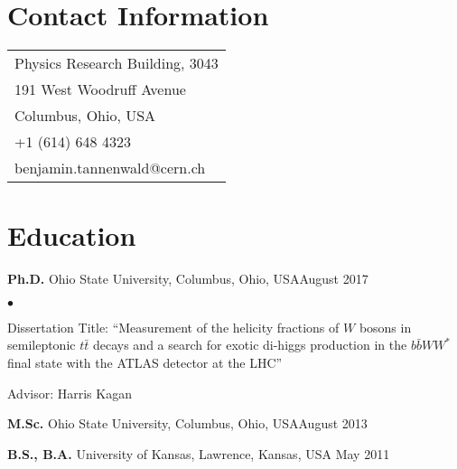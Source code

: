 \documentclass[margin,line]{res}
\newenvironment{list1}{
  \begin{list}{\ding{113}}{%
      \setlength{\itemsep}{0in}
      \setlength{\parsep}{0in} \setlength{\parskip}{0in}
      \setlength{\topsep}{0in} \setlength{\partopsep}{0in} 
      \setlength{\leftmargin}{0.17in}}}{\end{list}}
\newenvironment{list2}{
  \begin{list}{$\bullet$}{%
      \setlength{\itemsep}{0in}
      \setlength{\parsep}{0in} \setlength{\parskip}{0in}
      \setlength{\topsep}{0in} \setlength{\partopsep}{0in} 
      \setlength{\leftmargin}{0.2in}}}{\end{list}}
\begin{document}

\begin{resume}
\section{\sc Contact Information}
\vspace{.05in}
\begin{tabular}{@{}p{2in}}
Physics Research Building, 3043 \\
191 West Woodruff Avenue \\
Columbus, Ohio, USA \\
+1 (614) 648 4323 \\
benjamin.tannenwald@cern.ch \\
\end{tabular}


\section{\sc Education}
{\bf Ph.D.} Ohio State University, Columbus, Ohio, USA\hfill August 2017\\
\vspace*{-.22in}
\begin{list2}
\vspace*{.1in}
\item Dissertation Title:  ``Measurement of the helicity fractions of $W$ bosons in semileptonic $t\bar{t}$ decays and a search for exotic di-higgs production in the $b\bar{b}WW^*$ final state with the ATLAS detector at the LHC''
\item Advisor:  Harris Kagan
\end{list2}

{\bf M.Sc.} Ohio State University, Columbus, Ohio, USA\hfill August 2013\\
\vspace*{-.2in}

{\bf B.S., B.A.} University of Kansas, Lawrence, Kansas, USA \hfill May 2011\\


\end{resume}
\end{document}
